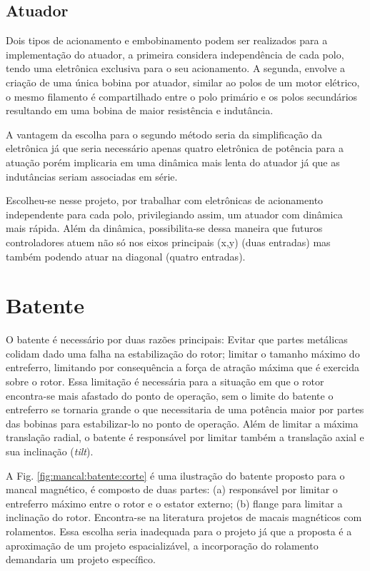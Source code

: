 \subsection{Atuador}

Dois tipos de acionamento e embobinamento podem ser realizados para a implementação do atuador, a primeira considera independência de cada polo, tendo uma eletrônica exclusiva para o seu acionamento. A segunda, envolve a criação de uma única bobina por atuador, similar ao polos de um motor elétrico, o mesmo filamento é compartilhado entre o polo primário e os polos secundários resultando em uma bobina de maior resistência e indutância. 

A vantagem da escolha para o segundo método seria da simplificação da eletrônica já que seria necessário apenas quatro eletrônica de potência para a atuação porém implicaria em uma dinâmica mais lenta do atuador já que as indutâncias seriam associadas em série.

Escolheu-se nesse projeto, por trabalhar com eletrônicas de acionamento independente para cada polo, privilegiando assim, um atuador com dinâmica mais rápida. Além da dinâmica, possibilita-se dessa maneira que futuros controladores atuem não só nos eixos principais (x,y) (duas entradas) mas também podendo atuar na diagonal (quatro entradas). 

\section{Batente}

 O batente é necessário por duas razões principais: Evitar que partes metálicas colidam dado uma falha na estabilização do rotor; limitar o tamanho máximo do entreferro, limitando por consequência a força de atração máxima que é exercida sobre o rotor.  Essa limitação é necessária para a situação em que o rotor encontra-se mais afastado do ponto de operação, sem o limite do batente o entreferro se tornaria grande o que necessitaria de uma potência maior por partes das bobinas para estabilizar-lo no ponto de operação.  Além de limitar a máxima translação radial, o batente é responsável por limitar também a translação axial e sua inclinação (\textit{tilt}).
 
 A Fig. \ref{fig:mancal:batente:corte} é uma ilustração do batente proposto para o mancal magnético, é composto de duas partes: (a) responsável por limitar o entreferro máximo entre o rotor e o estator externo; (b) flange para limitar a inclinação do rotor. Encontra-se na literatura projetos de macais magnéticos com rolamentos. Essa escolha seria inadequada para o projeto já que a proposta é a aproximação de um projeto espacializável, a incorporação do rolamento demandaria um projeto específico.
 

